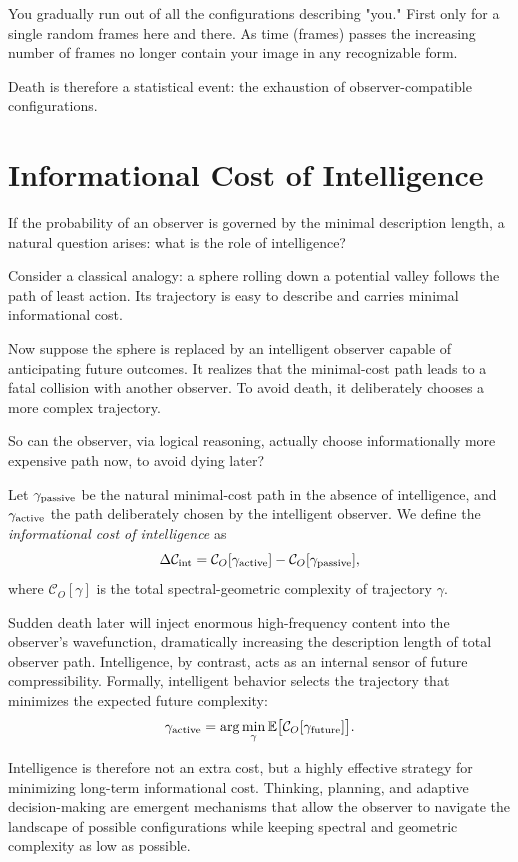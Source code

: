 You gradually run out of all the configurations describing "you." First only for a single random frames here and there.
As time (frames) passes the increasing number of frames no longer contain your image in any recognizable form.

Death is therefore a statistical event: the exhaustion of observer-compatible configurations.



\section{Informational Cost of Intelligence}

If the probability of an observer is governed by the minimal description length, 
a natural question arises: what is the role of intelligence?

Consider a classical analogy: a sphere rolling down a potential valley follows the path of least action.
Its trajectory is easy to describe and carries minimal informational cost.

Now suppose the sphere is replaced by an intelligent observer capable of anticipating future outcomes.
It realizes that the minimal-cost path leads to a fatal collision with another observer.
To avoid death, it deliberately chooses a more complex trajectory.

So can the observer, via logical reasoning, actually choose informationally more expensive path now, to avoid dying later? 

Let $\gamma_{\rm passive}$ be the natural minimal-cost path in the absence of intelligence, and $\gamma_{\rm active}$ the path deliberately chosen by the intelligent observer.
We define the \emph{informational cost of intelligence} as
\[
\Delta \mathcal{C}_{\rm int} = \mathcal{C}_O[\gamma_{\rm active}] - \mathcal{C}_O[\gamma_{\rm passive}],
\]
where $\mathcal{C}_O[\gamma]$ is the total spectral-geometric complexity of trajectory $\gamma$.

Sudden death later will inject enormous high-frequency content into the observer's wavefunction, dramatically increasing the description length of total observer path.
Intelligence, by contrast, acts as an internal sensor of future compressibility.
Formally, intelligent behavior selects the trajectory that minimizes the expected future complexity:
\[
\gamma_{\rm active} = \arg\min_\gamma \mathbb{E}\bigl[\mathcal{C}_O[\gamma_{\rm future}]\bigr].
\]

Intelligence is therefore not an extra cost, but a highly effective strategy for minimizing long-term informational cost.
Thinking, planning, and adaptive decision-making are emergent mechanisms that allow the observer to navigate the landscape of possible configurations while keeping spectral and geometric complexity as low as possible.

